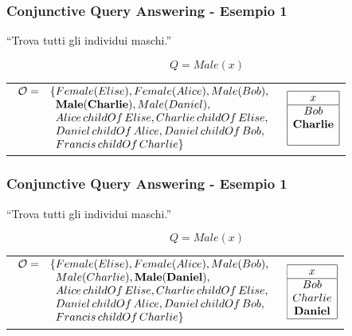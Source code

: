 \documentclass[8pt]{beamer}
\begin{document}
\begin{frame}
\frametitle{Conjunctive Query Answering - Esempio 1}
\begin{center}
``Trova tutti gli individui maschi.'' 
\end{center}
\[
 Q=Male(x)
\]
\vspace{\baselineskip}

\begin{tabular}{lc}
$\begin{array}{cl}
  \Ont  =  &  \{Female(Elise),  Female(Alice), Male(Bob), \\
  &\phantom{\{}\mathbf{Male(Charlie)}, Male(Daniel), \\
  &\phantom{\{}Alice\,childOf\,Elise, Charlie\,childOf\,Elise, \\
  &\phantom{\{}Daniel\,childOf\,Alice, Daniel\,childOf\,Bob, \\
  &\phantom{\{}Francis\,childOf\,Charlie \}\\
\end{array}$ & 
$\begin{array}{|c|}
  \hline
  x\\
  \hline
  Bob\\
  \mathbf{Charlie}\\
  \phantom{Daniel}\\
  \hline
\end{array}$ \\
\end{tabular}
\end{frame}

\begin{frame}
\frametitle{Conjunctive Query Answering - Esempio 1}
\begin{center}
``Trova tutti gli individui maschi.'' 
\end{center}
\[
 Q=Male(x)
\]
\vspace{\baselineskip}

\begin{tabular}{lc}
$\begin{array}{cl}
  \Ont  =  &  \{Female(Elise),  Female(Alice), Male(Bob), \\
  &\phantom{\{}Male(Charlie), \mathbf{Male(Daniel)}, \\
  &\phantom{\{}Alice\,childOf\,Elise, Charlie\,childOf\,Elise, \\
  &\phantom{\{}Daniel\,childOf\,Alice, Daniel\,childOf\,Bob, \\
  &\phantom{\{}Francis\,childOf\,Charlie \}\\
\end{array}$ & 
$\begin{array}{|c|}
  \hline
  x\\
  \hline
  Bob\\
  Charlie\\
  \mathbf{Daniel}\\
  \hline
\end{array}$ \\
\end{tabular}
\end{frame}
\end{document}
